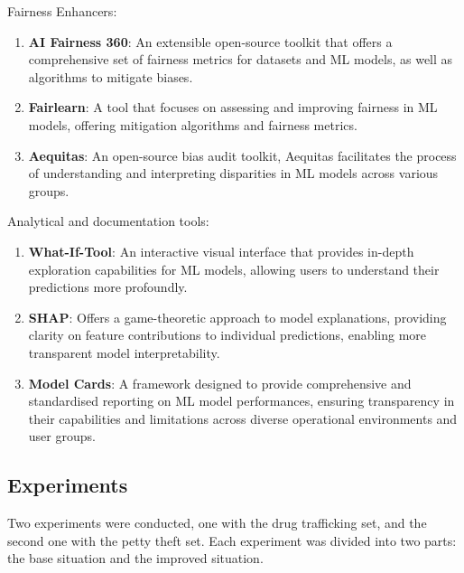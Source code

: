 \documentclass[fleqn,10pt]{wlscirep}
\begin{document}
Fairness Enhancers:

\begin{enumerate}
    
    \item \textbf{AI Fairness 360}: An extensible open-source toolkit that offers a comprehensive set of fairness metrics for datasets and ML models, as well as algorithms to mitigate biases.
    
    \item \textbf{Fairlearn}: A tool that focuses on assessing and improving fairness in ML models, offering mitigation algorithms and fairness metrics.

    \item \textbf{Aequitas}: An open-source bias audit toolkit, Aequitas facilitates the process of understanding and interpreting disparities in ML models across various groups.
\end{enumerate}

Analytical and documentation tools:

\begin{enumerate}
    \item \textbf{What-If-Tool}: An interactive visual interface that provides in-depth exploration capabilities for ML models, allowing users to understand their predictions more profoundly.
    
    \item \textbf{SHAP}: Offers a game-theoretic approach to model explanations, providing clarity on feature contributions to individual predictions, enabling more transparent model interpretability.
    
    \item \textbf{Model Cards}: A framework designed to provide comprehensive and standardised reporting on ML model performances, ensuring transparency in their capabilities and limitations across diverse operational environments and user groups.
\end{enumerate}

\subsection{Experiments}

Two experiments were conducted, one with the drug trafficking set, and the second one with the petty theft set. Each experiment was divided into two parts: the base situation and the improved situation.
\end{document}

